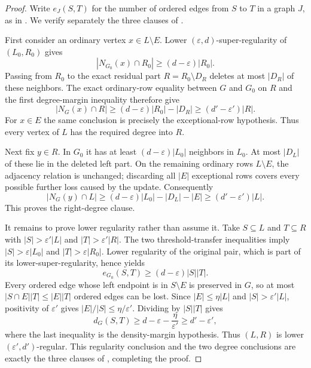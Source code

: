 \begin{proof}
Write $e_J(S,T)$ for the number of ordered edges from $S$ to $T$ in a graph
$J$, as in .  We verify separately the three clauses of
.

First consider an ordinary vertex $x\in L\setminus E$.  Lower
$(\varepsilon,d)$-super-regularity of $(L_0,R_0)$ gives
\[
 |N_{G_0}(x)\cap R_0|\geq(d-\varepsilon)|R_0|.
\]
Passing from $R_0$ to the exact residual part $R=R_0\setminus D_R$ deletes at
most $|D_R|$ of these neighbors.  The exact ordinary-row equality between
$G$ and $G_0$ on $R$ and the first degree-margin inequality therefore give
\[
 |N_G(x)\cap R|\geq(d-\varepsilon)|R_0|-|D_R|
 \geq(d'-\varepsilon')|R|.
\]
For $x\in E$ the same conclusion is precisely the exceptional-row hypothesis.
Thus every vertex of $L$ has the required degree into $R$.

Next fix $y\in R$.  In $G_0$ it has at least
$(d-\varepsilon)|L_0|$ neighbors in $L_0$.  At most $|D_L|$ of these lie in
the deleted left part.  On the remaining ordinary rows $L\setminus E$, the
adjacency relation is unchanged; discarding all $|E|$ exceptional rows covers
every possible further loss caused by the update.  Consequently
\[
 |N_G(y)\cap L|\geq(d-\varepsilon)|L_0|-|D_L|-|E|
 \geq(d'-\varepsilon')|L|.
\]
This proves the right-degree clause.

It remains to prove lower regularity rather than assume it.  Take
$S\subseteq L$ and $T\subseteq R$ with
$|S|>\varepsilon'|L|$ and $|T|>\varepsilon'|R|$.  The two threshold-transfer
inequalities imply $|S|>\varepsilon|L_0|$ and
$|T|>\varepsilon|R_0|$.  Lower regularity of the original pair, which is part
of its lower-super-regularity, hence yields
\[
 e_{G_0}(S,T)\geq(d-\varepsilon)|S||T|.
\]
Every ordered edge whose left endpoint is in $S\setminus E$ is preserved in
$G$, so at most $|S\cap E||T|\leq |E||T|$ ordered edges can be lost.  Since
$|E|\leq\eta|L|$ and $|S|>\varepsilon'|L|$, positivity of $\varepsilon'$ gives
$|E|/|S|\leq\eta/\varepsilon'$.  Dividing by $|S||T|$ gives
\[
 d_G(S,T)\geq d-\varepsilon-\frac{\eta}{\varepsilon'}
 \geq d'-\varepsilon',
\]
where the last inequality is the density-margin hypothesis.  Thus $(L,R)$ is
lower $(\varepsilon',d')$-regular.  This regularity conclusion and the two
degree conclusions are exactly the three clauses of
, completing the proof.
\end{proof}
